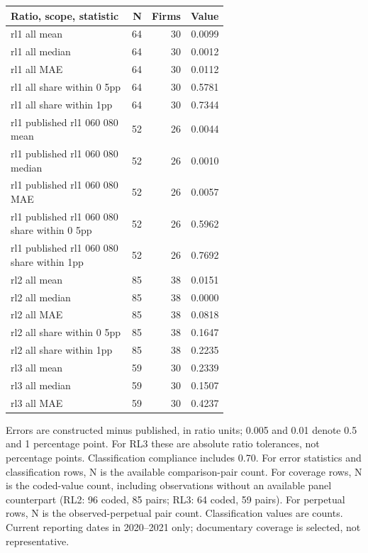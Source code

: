 \begin{table}[!htbp]\centering\scriptsize
\begin{tabular}{p{0.61\linewidth}rrr}
\toprule
Ratio, scope, statistic & N & Firms & Value \\
\midrule
rl1 all mean & 64 & 30 & 0.0099 \\
rl1 all median & 64 & 30 & 0.0012 \\
rl1 all MAE & 64 & 30 & 0.0112 \\
rl1 all share within 0 5pp & 64 & 30 & 0.5781 \\
rl1 all share within 1pp & 64 & 30 & 0.7344 \\
rl1 published rl1 060 080 mean & 52 & 26 & 0.0044 \\
rl1 published rl1 060 080 median & 52 & 26 & 0.0010 \\
rl1 published rl1 060 080 MAE & 52 & 26 & 0.0057 \\
rl1 published rl1 060 080 share within 0 5pp & 52 & 26 & 0.5962 \\
rl1 published rl1 060 080 share within 1pp & 52 & 26 & 0.7692 \\
rl2 all mean & 85 & 38 & 0.0151 \\
rl2 all median & 85 & 38 & 0.0000 \\
rl2 all MAE & 85 & 38 & 0.0818 \\
rl2 all share within 0 5pp & 85 & 38 & 0.1647 \\
rl2 all share within 1pp & 85 & 38 & 0.2235 \\
rl3 all mean & 59 & 30 & 0.2339 \\
rl3 all median & 59 & 30 & 0.1507 \\
rl3 all MAE & 59 & 30 & 0.4237 \\
\bottomrule
\end{tabular}
\par\smallskip\parbox{0.95\linewidth}{\footnotesize Errors are constructed minus published, in ratio units; 0.005 and 0.01 denote 0.5 and 1 percentage point. For RL3 these are absolute ratio tolerances, not percentage points. Classification compliance includes 0.70. For error statistics and classification rows, N is the available comparison-pair count. For coverage rows, N is the coded-value count, including observations without an available panel counterpart (RL2: 96 coded, 85 pairs; RL3: 64 coded, 59 pairs). For perpetual rows, N is the observed-perpetual pair count. Classification values are counts. Current reporting dates in 2020--2021 only; documentary coverage is selected, not representative.}
\end{table}

